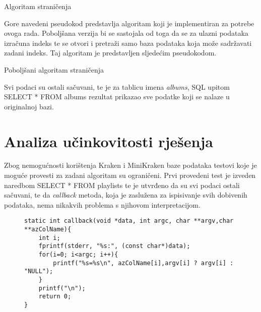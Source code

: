 \documentclass[times, utf8, zavrsni]{fer}
\begin{document}
	\begin{algorithm}[H]
		\caption{Algoritam straničenja}
		\label{Stranicenje}
	\end{algorithm}

Gore navedeni pseudokod predstavlja algoritam koji je implementiran za potrebe ovoga rada. Poboljšana verzija bi se sastojala od toga da se za ulazni podataka izračuna indeks te se otvori i pretraži samo baza podataka koja može sadržavati zadani indeks. Taj algoritam je predstavljen sljedećim pseudokodom.
\newline
	\begin{algorithm}[H]
		\caption{Poboljšani algoritam straničenja}
		\label{Stranicenje2}
	\end{algorithm}

Svi podaci su ostali sačuvani, te je za tablicu imena \textit{albums}, SQL upitom SELECT * FROM albums rezultat prikazao sve podatke koji se nalaze u originalnoj bazi.
\chapter{Analiza učinkovitosti rješenja}
Zbog nemogućnosti korištenja Kraken i MiniKraken baze podataka testovi koje je moguće provesti za zadani algoritam su ograničeni. Prvi provedeni test je izveden naredbom SELECT * FROM playlists te je utvrđeno da su svi podaci ostali sačuvani, te da \textit{callback} metoda, koja je zaslužena za ispisivanje svih dobivenih podataka, nema nikakvih problema s njihovom interpretacijom. 
\newline
\begin{figure}[hbp]
	\begin{lstlisting}
static int callback(void *data, int argc, char **argv,char **azColName){
	int i;
	fprintf(stderr, "%s:", (const char*)data);
	for(i=0; i<argc; i++){
		printf("%s=%s\n", azColName[i],argv[i] ? argv[i] : "NULL");
	}
	printf("\n");
	return 0;
}
	\end{lstlisting}
\end{figure}
\end{document}

